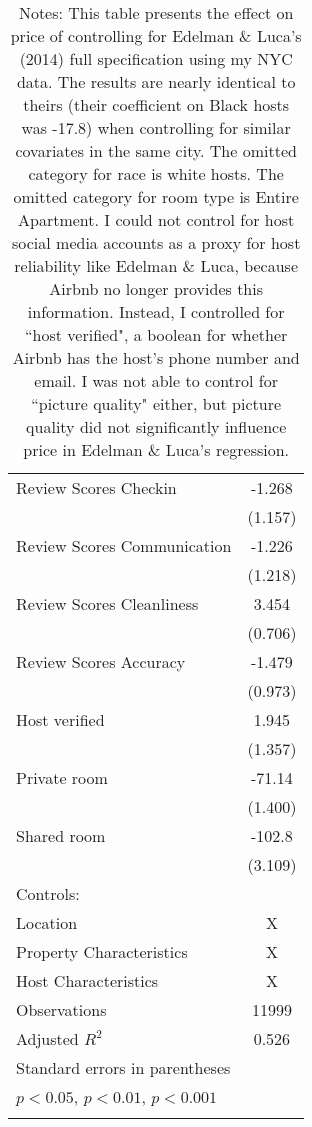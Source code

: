 {\begin{longtable}{l*{1}{c}}
Review Scores Checkin&      -1.268         \\
                    &     (1.157)         \\
Review Scores Communication&      -1.226         \\
                    &     (1.218)         \\
Review Scores Cleanliness&       3.454\sym{***}\\
                    &     (0.706)         \\
Review Scores Accuracy&      -1.479         \\
                    &     (0.973)         \\
Host verified &       1.945         \\
                    &     (1.357)         \\
Private room        &      -71.14\sym{***}\\
                    &     (1.400)         \\
Shared room         &      -102.8\sym{***}\\
                    &     (3.109)         \\
\hline
Controls:        \\
\hspace{3mm} Location  &                           X      \\
\hspace{3mm} Property Characteristics  &   X         \\
\hspace{3mm} Host Characteristics  &         X        \\
\hline
Observations        &       11999         \\
Adjusted \(R^{2}\)  &       0.526         \\
\hline\hline
\multicolumn{2}{l}{\footnotesize Standard errors in parentheses}\\
\multicolumn{2}{l}{\footnotesize \sym{*} \(p<0.05\), \sym{**} \(p<0.01\), \sym{***} \(p<0.001\)}\\
\caption*{\footnotesize Notes: This table presents the effect on price of controlling for Edelman \& Luca's (2014) full specification using my NYC data. The results are nearly identical to theirs (their coefficient on Black hosts was -17.8) when controlling for similar covariates in the same city. The omitted category for race is white hosts. The omitted category for room type is Entire Apartment. I could not control for host social media accounts as a proxy for host reliability like Edelman \& Luca, because Airbnb no longer provides this information. Instead, I controlled for ``host verified", a boolean for whether Airbnb has the host's phone number and email. I was not able to control for ``picture quality" either, but picture quality did not significantly influence price in Edelman \& Luca's regression.}\\
\end{longtable}
}


